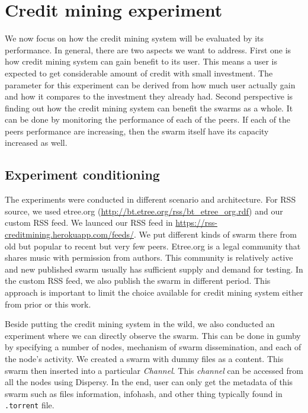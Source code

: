 \section{Credit mining experiment}
\label{section:cmexp}
We now focus on how the credit mining system will be evaluated by its performance. In general, there are two aspects we want to address. First one is how credit mining system can gain benefit to its user. This means a user is expected to get considerable amount of credit with small investment. The parameter for this experiment can be derived from how much user actually gain and how it compares to the investment they already had. Second perspective is finding out how the credit mining system can benefit the swarms as a whole. It can be done by monitoring the performance of each of the peers. If each of the peers performance are increasing, then the swarm itself have its capacity increased as well.

\subsection{Experiment conditioning}
The experiments were conducted in different scenario and architecture. For RSS source, we used etree.org (\url{http://bt.etree.org/rss/bt_etree_org.rdf}) and our custom RSS feed. We launced our RSS feed in \url{https://rss-creditmining.herokuapp.com/feeds/}. We put different kinds of swarm there from old but popular to recent but very few peers. Etree.org is a legal community that shares music with permission from authors. This community is relatively active and new published swarm usually has sufficient supply and demand for testing. In the custom RSS feed, we also publish the swarm in different period. This approach is important to limit the choice available for credit mining system either from prior or this work. 

Beside putting the credit mining system in the wild, we also conducted an experiment where we can directly observe the swarm. This can be done in gumby by specifying a number of nodes, mechanism of swarm dissemination, and each of the node's activity. We created a swarm with dummy files as a content. This swarm then inserted into a particular \textit{Channel}. This \textit{channel} can be accessed from all the nodes using Dispersy. In the end, user can only get the metadata of this swarm such as files information, infohash, and other thing typically found in \texttt{.torrent} file. 

